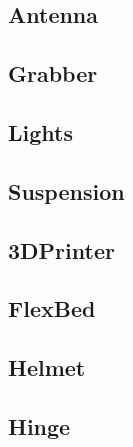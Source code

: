 \newcommand{\AssemblyInstructionManual}[1]{
 \subsection{#1}
 
 }


\newcommand{\AssemblyManualStep}[4]{
\subsubsection{Step #1}
\begin{center}
#3
\begin{figure}[!ht]
\centering
\texttt{[image: \#2]}
\caption{#4}
\end{figure}
\end{center}
\clearpage
}

\newcommand{\AssemblyManualStepTwo}[4]{
\subsubsection{Step #1}
\begin{center}
#3
\begin{figure}[!ht]
\centering
\texttt{[image: \#2]}
\caption{#4}
\end{figure}
\end{center}
}

\AssemblyInstructionManual{Antenna}
\clearpage
\AssemblyInstructionManual{Grabber}
\clearpage
\AssemblyInstructionManual{Lights}
\clearpage
\AssemblyInstructionManual{Suspension}
\clearpage
\AssemblyInstructionManual{3DPrinter}
\clearpage
\AssemblyInstructionManual{FlexBed}
\clearpage
\AssemblyInstructionManual{Helmet}
\clearpage
\AssemblyInstructionManual{Hinge}

